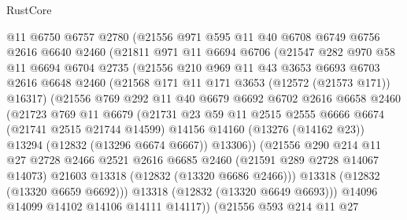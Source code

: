 \begin{lexlean}{RustCore}
\begin{coremodule}
          @11
          @6750
          @6757
          @2780
          (@21556
            @971
            @595
            @11
            @40
            @6708
            @6749
            @6756
            @2616
            @6640
            @2460
            (@21811
              @971
              @11
              @6694
              @6706
              (@21547
                @282
                @970
                @58
                @11
                @6694
                @6704
                @2735
                (@21556
                  @210
                  @969
                  @11
                  @43
                  @3653
                  @6693
                  @6703
                  @2616
                  @6648
                  @2460
                  (@21568 @171 @11 @171 @3653 (@12572 (@21573 @171)) @16317)
                  (@21556
                    @769
                    @292
                    @11
                    @40
                    @6679
                    @6692
                    @6702
                    @2616
                    @6658
                    @2460
                    (@21723
                      @769
                      @11
                      @6679
                      (@21731
                        @23
                        @59
                        @11
                        @2515
                        @2555
                        @6666
                        @6674
                        (@21741 @2515 @21744 @14599)
                        @14156
                        @14160
                        (@13276 (@14162 @23))
                        @13294
                        (@12832 (@13296 @6674 @6667))
                        @13306))
                    (@21556
                      @290
                      @214
                      @11
                      @27
                      @2728
                      @2466
                      @2521
                      @2616
                      @6685
                      @2460
                      (@21591 @289 @2728 @14067 @14073)
                      @21603
                      @13318
                      (@12832 (@13320 @6686 @2466)))
                    @13318
                    (@12832 (@13320 @6659 @6692)))
                  @13318
                  (@12832 (@13320 @6649 @6693)))
                @14096
                @14099
                @14102
                @14106
                @14111
                @14117))
            (@21556
              @593
              @214
              @11
              @27

\end{coremodule}
\end{lexlean}
